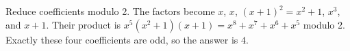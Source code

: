 Reduce coefficients modulo 2. The factors become $x$, $x$, $(x+1)^2=x^2+1$, $x^3$, and $x+1$. Their product is $x^5(x^2+1)(x+1)=x^8+x^7+x^6+x^5$ modulo 2. Exactly these four coefficients are odd, so the answer is $\boxed4$.
